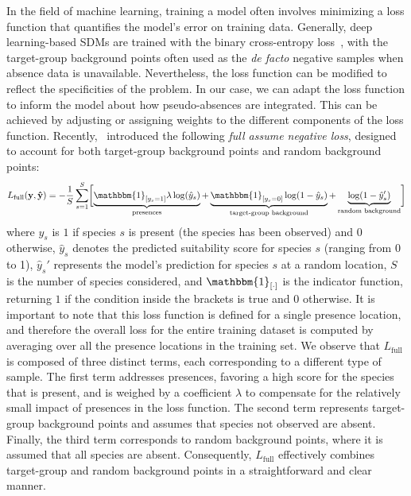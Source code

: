 \documentclass[3p,preprint,12pt]{elsarticle}
\begin{document}
In the field of machine learning, training a model often involves minimizing a loss function that quantifies the model's error on training data. Generally, deep learning-based SDMs are trained with the binary cross-entropy loss~\citep{benkendorf2020effects, deneu2021convolutional, zhang2022novel, zbindenspecies}, with the target-group background points often used as the \textit{de facto} negative samples when absence data is unavailable. Nevertheless, the loss function can be modified to reflect the specificities of the problem. In our case, we can adapt the loss function to inform the model about how pseudo-absences are integrated. This can be achieved by adjusting or assigning weights to the different components of the loss function.
Recently,~\cite{cole2023spatial} introduced the following \textit{full assume negative loss}, designed to account for both target-group background points and random background points:
\begin{align}
    L_{\text{full}}(\mathbf{y}, \mathbf{\hat{y}}) = - \frac{1}{S} \sum^S_{s=1}\biggl[ \underbrace{\mathbbm{1}_{[y_s=1]} \lambda \log(\hat{y}_s)}_{\text{presences}} + \underbrace{\mathbbm{1}_{[y_s=0]} \log(1 - \hat{y}_s)}_{\text{target-group background}} + \underbrace{\log(1 - \hat{y}_s')}_{\text{random background}} \biggr]
\end{align}
where $y_s$ is $1$ if species $s$ is present (the species has been observed) and $0$ otherwise, $\hat{y}_s$ denotes the predicted suitability score for species $s$ (ranging from 0 to 1), $\hat{y}_s'$ represents the model's prediction for species $s$ at a random location, $S$ is the number of species considered, and $\mathbbm{1}_{[\cdot]}$ is the indicator function, returning $1$ if the condition inside the brackets is true and $0$ otherwise.
It is important to note that this loss function is defined for a single presence location, and therefore the overall loss for the entire training dataset is computed by averaging over all the presence locations in the training set.
We observe that $L_{\text{full}}$ is composed of three distinct terms, each corresponding to a different type of sample. The first term addresses presences, favoring a high score for the species that is present, and is weighed by a coefficient $\lambda$ to compensate for the relatively small impact of presences in the loss function. The second term represents target-group background points and assumes that species not observed are absent. Finally, the third term corresponds to random background points, where it is assumed that all species are absent. 
Consequently, $L_{\text{full}}$ effectively combines target-group and random background points in a straightforward and clear manner.
\end{document}
